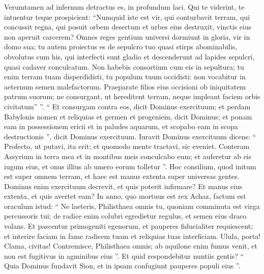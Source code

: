 \begin{biblechapter}
\begin{biblechapter}
\begin{biblechapter}
\begin{biblechapter}
\begin{biblechapter}
\begin{biblechapter}
\begin{biblechapter}
\begin{biblechapter}
\begin{biblechapter}
\begin{biblechapter}
\begin{biblechapter}
\begin{biblechapter}
\begin{biblechapter}
\begin{biblechapter}
 \verse Verumtamen ad infernum detractus es,
 in profundum laci.
 \verse Qui te viderint, te intuentur
 teque prospicient:
 “Numquid iste est vir, qui conturbavit terram,
 qui concussit regna,
 \verse qui posuit orbem desertum
 et urbes eius destruxit,
 vinctis eius non aperuit carcerem?
 \verse Omnes reges gentium universi dormiunt in gloria,
 vir in domo sua;
 \verse tu autem proiectus es de sepulcro tuo
 quasi stirps abominabilis,
 obvolutus cum his, qui interfecti sunt gladio
 et descenderunt ad lapides sepulcri,
 quasi cadaver conculcatum.
 \verse Non habebis consortium cum eis in sepultura;
 tu enim terram tuam disperdidisti,
 tu populum tuum occidisti:
 non vocabitur in aeternum semen malefactorum.
 \verse Praeparate filios eius occisioni
 ob iniquitatem patrum suorum;
 ne consurgant, ut hereditent terram,
 neque impleant faciem orbis civitatum” ”.
 \verse “ Et consurgam contra eos,
 dicit Dominus exercituum;
 et perdam Babylonis nomen et reliquias
 et germen et progeniem, dicit Dominus;
 \verse et ponam eam in possessionem ericii
 et in paludes aquarum,
 et scopabo eam in scopa destructionis ”,
 dicit Dominus exercituum.
 \verse Iuravit Dominus exercituum dicens:
 “ Profecto, ut putavi, ita erit;
 et quomodo mente tractavi, sic eveniet.
 \verse Conteram Assyrium in terra mea
 et in montibus meis conculcabo eum;
 et auferetur ab eis iugum eius,
 et onus illius ab umero eorum tolletur ”.
 \verse Hoc consilium, quod initum est
 super omnem terram,
 et haec est manus extenta
 super universas gentes.
 \verse Dominus enim exercituum decrevit,
 et quis poterit infirmare?
 Et manus eius extenta,
 et quis avertet eam?
 \verse In anno, quo mortuus est rex Achaz, factum est oraculum istud:
 \verse “ Ne laeteris, Philisthaea omnis tu,
 quoniam comminuta est virga percussoris tui;
 de radice enim colubri egredietur regulus,
 et semen eius draco volans.
 \verse Et pascentur primogeniti egenorum,
 et pauperes fiducialiter requiescent;
 et interire faciam in fame radicem tuam
 et reliquias tuas interficiam.
 \verse Ulula, porta! Clama, civitas!
 Contremisce, Philisthaea omnis;
 ab aquilone enim fumus venit,
 et non est fugitivus in agminibus eius ”.
 \verse Et quid respondebitur nuntiis gentis?
 “ Quia Dominus fundavit Sion,
 et in ipsam confugiunt pauperes populi eius ”.
 

\end{biblechapter}
\end{biblechapter}
\end{biblechapter}
\end{biblechapter}
\end{biblechapter}
\end{biblechapter}
\end{biblechapter}
\end{biblechapter}
\end{biblechapter}
\end{biblechapter}
\end{biblechapter}
\end{biblechapter}
\end{biblechapter}
\end{biblechapter}
